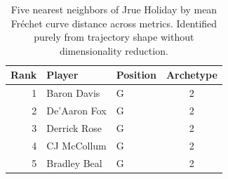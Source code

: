 \begin{table}[htbp]
  \centering\small
  \begin{tabular}{rllc}
    \toprule
    Rank & Player & Position & Archetype \\
    \midrule
    1 & Baron Davis & G & 2 \\
    2 & De'Aaron Fox & G & 2 \\
    3 & Derrick Rose & G & 2 \\
    4 & CJ McCollum & G & 2 \\
    5 & Bradley Beal & G & 2 \\
    \bottomrule
  \end{tabular}
  \caption{Five nearest neighbors of Jrue Holiday by mean Fr\'{e}chet curve distance across metrics. Identified purely from trajectory shape without dimensionality reduction.}
  \label{tab:Jrue_Holiday_frechet_curve_neighbors}
\end{table}

